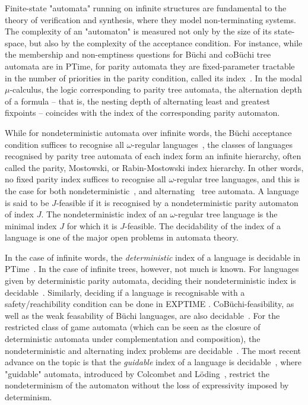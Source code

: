 \documentclass[a4paper,UKenglish,cleveref, autoref, thm-restate]{lipics-v2021}
\newcommand{\ptime}{{\sc PTime}}
\begin{document}
Finite-state "automata" running on infinite structures are fundamental to the theory of verification and synthesis, where they model non-terminating systems. 
The complexity of an "automaton" is measured not only by the size of its state-space, but  also by the complexity of the acceptance condition. For instance, while the membership and non-emptiness questions for B\"uchi and coB\"uchi tree automata are in \ptime, for parity automata they are fixed-parameter tractable in the number of priorities in the parity condition, called its index~\cite{Calude2017DecidingPG}. In the modal $\mu$-calculus, the logic corresponding to parity tree automata, the alternation depth of a formula -- that is, the nesting depth of alternating least and greatest fixpoints -- coincides with the index of the corresponding parity automaton.

While for nondeterministic automata over infinite words, the B\"uchi acceptance condition suffices to recognise all $\omega$-regular languages~\cite{Rabin1968DecidabilityOS}, the classes of languages recognised by parity tree automata of each index form an infinite hierarchy, often called the parity, Mostowski, or Rabin-Mostowski index hierarchy. In other words, no fixed parity index suffices to recognise all $\omega$-regular tree languages, and this is the case for both nondeterministic~\cite{Niwinski1986OnFC}, and alternating~\cite{Bra98, Len96} tree automata.
A language is said to be $J$-feasible if it is recognised by a nondeterministic parity automaton of index $J$.
The nondeterministic index of an $\omega$-regular tree language is the minimal index $J$ for which it is $J$-feasible. The decidability of the index of a language is one of the major open problems in automata theory.

In the case of infinite words, the \textit{deterministic} index of a language is decidable in \ptime~\cite{Niwinski1998RelatingHO}. In the case of infinite trees, however, not much is known. For languages given by deterministic parity automata, deciding their nondeterministic index is decidable~\cite{NW05}. Similarly, deciding if a language is recognisable with a safety/reachibility condition can be done in EXPTIME \cite{Walukiewicz2002DecidingLL}. CoB\"uchi-feasibility, as well as the  weak feasability of B\"uchi languages, are also decidable~\cite{Colcombet2013DecidingTW,SW16}. For the restricted class of game automata (which can be seen as the closure of deterministic automata under complementation and composition), the nondeterministic and alternating index problems are decidable~\cite{GameAutomata}. The most recent advance on the topic is that the \textit{guidable} index of a language is decidable~\cite{NS21}, where "guidable" automata, introduced by Colcombet and L\"oding~\cite{Guidable}, restrict the nondeterminism of the automaton without the loss of expressivity imposed by determinism. 
\end{document}

